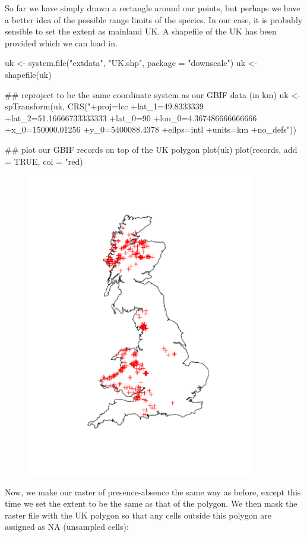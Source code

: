 \documentclass{article}[12pt, a4paper]
\begin{document}
So far we have simply drawn a rectangle around our points, but perhaps we have a better idea of the possible range limits of the species. In our case, it is probably sensible to set the extent as mainland UK. A shapefile of the UK has been provided which we can load in.

\begin{Schunk}
\begin{Sinput}
uk <- system.file("extdata", "UK.shp", package = "downscale")
uk <- shapefile(uk)

## reproject to be the same coordinate system as our GBIF data (in km)
uk <- spTransform(uk,
                  CRS("+proj=lcc +lat_1=49.8333339 +lat_2=51.16666733333333
                       +lat_0=90 +lon_0=4.367486666666666 +x_0=150000.01256 
                       +y_0=5400088.4378 +ellps=intl +units=km +no_defs"))

## plot our GBIF records on top of the UK polygon
plot(uk)
plot(records, add = TRUE, col = "red)
\end{Sinput}
\end{Schunk}

\begin{figure}[!ht]
\centering
\includegraphics[width=10cm]{Downscaling-downscale38}
\end{figure}

\newpage
Now, we make our raster of presence-absence the same way as before, except this time we set the extent to be the same as that of the polygon. We then mask the raster file with the UK polygon so that any cells outside this polygon are assigned as NA (unsampled cells):
\end{document}
